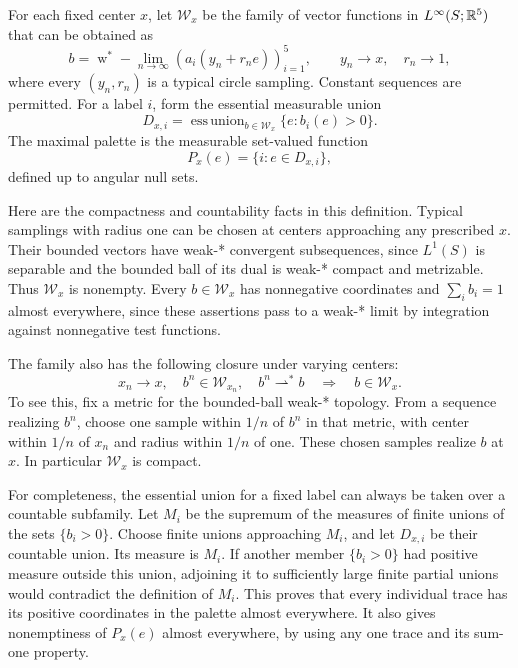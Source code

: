 \begin{definition}
\label{def:palettes-traces}
For each fixed center \(x\), let \(\mathcal W_x\) be the family of
vector functions in \(L^\infty(S;\mathbb R^5)\) that can be obtained as
\[
 b=\operatorname{w}^*\!-\!\lim_{n\to\infty}
          (a_i(y_n+r_ne))_{i=1}^5,\qquad
 y_n\to x,\quad r_n\to1,
\]
where every \((y_n,r_n)\) is a typical circle sampling.
Constant sequences are permitted.
For a label \(i\), form the essential measurable union
\[
 D_{x,i}=\mathop{\operatorname{ess\,union}}_{b\in\mathcal W_x}
                            \{e:b_i(e)>0\}.
\]
The maximal palette is the measurable set-valued function
\[
 P_x(e)=\{i:e\in D_{x,i}\},
\]
defined up to angular null sets.
\end{definition}

Here are the compactness and countability facts in this definition.
Typical samplings with radius one can be chosen at centers approaching
any prescribed \(x\).  Their bounded vectors have weak-* convergent
subsequences, since \(L^1(S)\) is separable and the bounded ball
of its dual is weak-* compact and metrizable.  Thus \(\mathcal W_x\)
is nonempty.  Every \(b\in\mathcal W_x\) has nonnegative coordinates
and \(\sum_i b_i=1\) almost everywhere, since these assertions pass
to a weak-* limit by integration against nonnegative test functions.

The family also has the following closure under varying centers:
\begin{equation}\label{eq:palettes-trace-closure}
 x_n\to x,\quad b^n\in\mathcal W_{x_n},\quad
 b^n\rightharpoonup^* b
 \quad\Longrightarrow\quad b\in\mathcal W_x .
\end{equation}
To see this, fix a metric for the bounded-ball weak-* topology.
From a sequence realizing \(b^n\), choose one sample within \(1/n\)
of \(b^n\) in that metric, with center within \(1/n\) of \(x_n\)
and radius within \(1/n\) of one.  These chosen samples realize \(b\)
at \(x\).  In particular \(\mathcal W_x\) is compact.

For completeness, the essential union for a fixed label can always
be taken over a countable subfamily.  Let \(M_i\) be the supremum
of the measures of finite unions of the sets \(\{b_i>0\}\).
Choose finite unions approaching \(M_i\), and let \(D_{x,i}\) be
their countable union.  Its measure is \(M_i\).  If another member
\(\{b_i>0\}\) had positive measure outside this union, adjoining it
to sufficiently large finite partial unions would contradict the
definition of \(M_i\).  This proves that every individual trace
has its positive coordinates in the palette almost everywhere.
It also gives nonemptiness of \(P_x(e)\) almost everywhere, by
using any one trace and its sum-one property.

